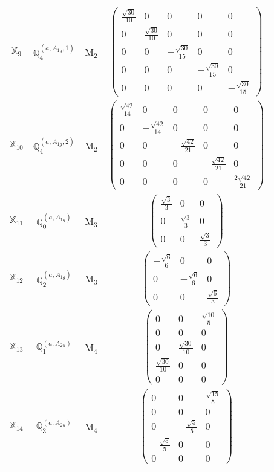 \documentclass[fleqn,10pt,landscape]{article}
\begin{document}
\begin{itemize}
\begin{center}
\begin{longtable}{c|c|c|c}
$ \mathbb{X}_{9} $ & $\mathbb{Q}_{4}^{(a,A_{1g},1)}$ & M$_{2}$ & $\begin{pmatrix} \frac{\sqrt{30}}{10} & 0 & 0 & 0 & 0 \\ 0 & \frac{\sqrt{30}}{10} & 0 & 0 & 0 \\ 0 & 0 & - \frac{\sqrt{30}}{15} & 0 & 0 \\ 0 & 0 & 0 & - \frac{\sqrt{30}}{15} & 0 \\ 0 & 0 & 0 & 0 & - \frac{\sqrt{30}}{15} \end{pmatrix}$ \\
$ \mathbb{X}_{10} $ & $\mathbb{Q}_{4}^{(a,A_{1g},2)}$ & M$_{2}$ & $\begin{pmatrix} \frac{\sqrt{42}}{14} & 0 & 0 & 0 & 0 \\ 0 & - \frac{\sqrt{42}}{14} & 0 & 0 & 0 \\ 0 & 0 & - \frac{\sqrt{42}}{21} & 0 & 0 \\ 0 & 0 & 0 & - \frac{\sqrt{42}}{21} & 0 \\ 0 & 0 & 0 & 0 & \frac{2 \sqrt{42}}{21} \end{pmatrix}$ \\ \hline
$ \mathbb{X}_{11} $ & $\mathbb{Q}_{0}^{(a,A_{1g})}$ & M$_{3}$ & $\begin{pmatrix} \frac{\sqrt{3}}{3} & 0 & 0 \\ 0 & \frac{\sqrt{3}}{3} & 0 \\ 0 & 0 & \frac{\sqrt{3}}{3} \end{pmatrix}$ \\
$ \mathbb{X}_{12} $ & $\mathbb{Q}_{2}^{(a,A_{1g})}$ & M$_{3}$ & $\begin{pmatrix} - \frac{\sqrt{6}}{6} & 0 & 0 \\ 0 & - \frac{\sqrt{6}}{6} & 0 \\ 0 & 0 & \frac{\sqrt{6}}{3} \end{pmatrix}$ \\ \hline
$ \mathbb{X}_{13} $ & $\mathbb{Q}_{1}^{(a,A_{2u})}$ & M$_{4}$ & $\begin{pmatrix} 0 & 0 & \frac{\sqrt{10}}{5} \\ 0 & 0 & 0 \\ 0 & \frac{\sqrt{30}}{10} & 0 \\ \frac{\sqrt{30}}{10} & 0 & 0 \\ 0 & 0 & 0 \end{pmatrix}$ \\
$ \mathbb{X}_{14} $ & $\mathbb{Q}_{3}^{(a,A_{2u})}$ & M$_{4}$ & $\begin{pmatrix} 0 & 0 & \frac{\sqrt{15}}{5} \\ 0 & 0 & 0 \\ 0 & - \frac{\sqrt{5}}{5} & 0 \\ - \frac{\sqrt{5}}{5} & 0 & 0 \\ 0 & 0 & 0 \end{pmatrix}$ \\

\end{longtable}
\end{center}
\end{itemize}
\end{document}
